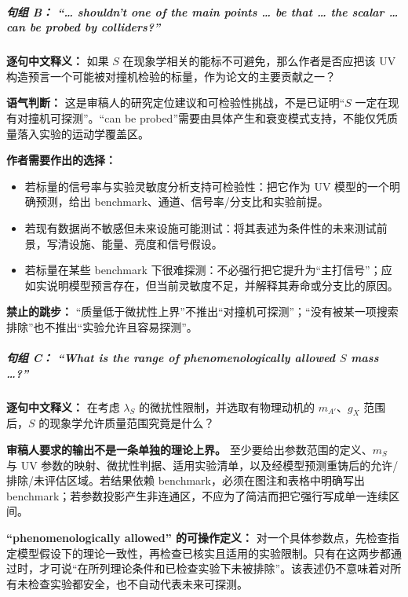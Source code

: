 \documentclass[
]{article}
\providecommand{\tightlist}{%
  \setlength{\itemsep}{0pt}\setlength{\parskip}{0pt}}
\begin{document}
\subparagraph{句组 B： ``\ldots{} shouldn't one of the main points
\ldots{} be that \ldots{} the scalar \ldots{} can be probed by
colliders?''}\label{ux53e5ux7ec4-b-shouldnt-one-of-the-main-points-be-that-the-scalar-can-be-probed-by-colliders}

\textbf{逐句中文释义：} 如果 \(S\)
在现象学相关的能标不可避免，那么作者是否应把该 UV
构造预言一个可能被对撞机检验的标量，作为论文的主要贡献之一？

\textbf{语气判断：}
这是审稿人的研究定位建议和可检验性挑战，不是已证明``\(S\)
一定在现有对撞机可探测''。``can be
probed''需要由具体产生和衰变模式支持，不能仅凭质量落入实验的运动学覆盖区。

\textbf{作者需要作出的选择：}

\begin{itemize}
\tightlist
\item
  若标量的信号率与实验灵敏度分析支持可检验性：把它作为 UV
  模型的一个明确预测，给出 benchmark、通道、信号率/分支比和实验前提。
\item
  若现有数据尚不敏感但未来设施可能测试：将其表述为条件性的未来测试前景，写清设施、能量、亮度和信号假设。
\item
  若标量在某些 benchmark
  下很难探测：不必强行把它提升为``主打信号''；应如实说明模型预言存在，但当前灵敏度不足，并解释其寿命或分支比的原因。
\end{itemize}

\textbf{禁止的跳步：}
``质量低于微扰性上界''不推出``对撞机可探测''；``没有被某一项搜索排除''也不推出``实验允许且容易探测''。

\subparagraph{\texorpdfstring{句组 C： ``What is the range of
phenomenologically allowed \(S\) mass
\ldots?''}{句组 C： ``What is the range of phenomenologically allowed S mass \ldots?''}}\label{ux53e5ux7ec4-c-what-is-the-range-of-phenomenologically-allowed-s-mass}

\textbf{逐句中文释义：} 在考虑 \(\lambda_S\)
的微扰性限制，并选取有物理动机的 \(m_{A'}\)、\(g_X\) 范围后，\(S\)
的现象学允许质量范围究竟是什么？

\textbf{审稿人要求的输出不是一条单独的理论上界。}
至少要给出参数范围的定义、\(m_S\) 与 UV
参数的映射、微扰性判据、适用实验清单，以及经模型预测重铸后的允许/排除/未评估区域。若结果依赖
benchmark，必须在图注和表格中明确写出
benchmark；若参数投影产生非连通区，不应为了简洁而把它强行写成单一连续区间。

\textbf{``phenomenologically allowed'' 的可操作定义：}
对一个具体参数点，先检查指定模型假设下的理论一致性，再检查已核实且适用的实验限制。只有在这两步都通过时，才可说``在所列理论条件和已检查实验下未被排除''。该表述仍不意味着对所有未检查实验都安全，也不自动代表未来可探测。
\end{document}
